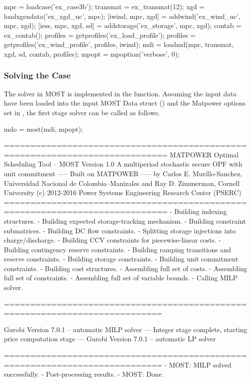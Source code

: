 \documentclass[12pt]{article}
\newcommand{\matpower}[0]{{\sc Matpower}}
\newcommand{\most}[0]{{MOST}}
\newcommand{\md}[0]{{\most{} Data struct}}
\newcommand{\code}[1]{{\relsize{-0.5}{\tt{{#1}}}}}  %
\numberwithin{equation}{section}
\numberwithin{table}{section}
\numberwithin{figure}{section}
\begin{document}

\begin{Code}
mpc = loadcase('ex_case3b');
transmat = ex_transmat(12);
xgd = loadxgendata('ex_xgd_uc', mpc);
[iwind, mpc, xgd] = addwind('ex_wind_uc', mpc, xgd);
[iess, mpc, xgd, sd] = addstorage('ex_storage', mpc, xgd);
contab = ex_contab();
profiles = getprofiles('ex_load_profile');
profiles = getprofiles('ex_wind_profile', profiles, iwind);
mdi = loadmd(mpc, transmat, xgd, sd, contab, profiles);
mpopt = mpoption('verbose', 0);
\end{Code}

\subsubsection{Solving the Case}

The solver in \most{} is implemented in the \code{most} function. Assuming the input data have been loaded into the input \md{} (\code{mdi}) and the \matpower{} options set in \code{mpopt}, the first stage solver can be called as follows.
\begin{Code}
mdo = most(mdi, mpopt);
\end{Code}

\begin{Code}
=============================================================================
          MATPOWER Optimal Scheduling Tool  --  MOST Version 1.0
          A multiperiod stochastic secure OPF with unit commitment
                       -----  Built on MATPOWER  -----
  by Carlos E. Murillo-Sanchez, Universidad Nacional de Colombia--Manizales
                  and Ray D. Zimmerman, Cornell University
       (c) 2012-2016 Power Systems Engineering Research Center (PSERC)       
=============================================================================
- Building indexing structures.
- Building expected storage-tracking mechanism.
- Building constraint submatrices.
  - Building DC flow constraints.
  - Splitting storage injections into charge/discharge.
  - Building CCV constraints for piecewise-linear costs.
  - Building contingency reserve constraints.
  - Building ramping transitions and reserve constraints.
  - Building storage constraints.
  - Building unit commitment constraints.
- Building cost structures.
- Assembling full set of costs.
- Assembling full set of constraints.
- Assembling full set of variable bounds.
- Calling MILP solver.

============================================================================

Gurobi Version 7.0.1 -- automatic MILP solver
--- Integer stage complete, starting price computation stage ---
Gurobi Version 7.0.1 -- automatic LP solver

============================================================================
- MOST: MILP solved successfully.
- Post-processing results.
- MOST: Done.
\end{Code}
\end{document}
